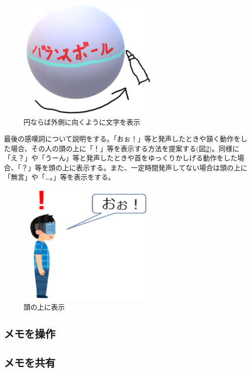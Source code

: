 \documentclass[11pt,a4j, titlepage]{jarticle} %
\begin{document}
\begin{figure}[H]
  \begin{center}
    \includegraphics[clip,height=6.0cm,width=7.0cm]{./moji_seiteki.eps}
    \caption{円ならば外側に向くように文字を表示}
    \label{fig:moji_seiteki}
  \end{center}
\end{figure}

最後の感嘆詞について説明をする。「おぉ！」等と発声したときや頷く動作をした場合、その人の頭の上に「！」等を表示する方法を提案する(図\ref{fig:kantanshi})。同様に「え？」や「うーん」等と発声したときや首をゆっくりかしげる動作をした場合、「？」等を頭の上に表示する。また、一定時間発声してない場合は頭の上に「無言」や「…。」等を表示をする。

\begin{figure}[H]
  \begin{center}
    \includegraphics[clip,height=6.0cm,width=7.0cm]{./kantanshi.eps}
    \caption{頭の上に表示}
    \label{fig:kantanshi}
  \end{center}
\end{figure}

\subsection{メモを操作}


\subsection{メモを共有}
\end{document}
